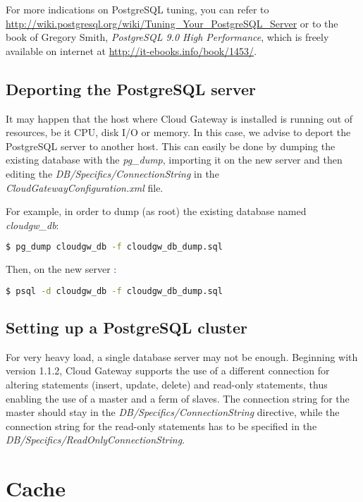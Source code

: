 \documentclass[11pt,fleqn,openany]{book} %
\newcommand{\cgversion}{1.1.2}
\begin{document}
For more indications on PostgreSQL tuning, you can refer to \url{http://wiki.postgresql.org/wiki/Tuning\_Your\_PostgreSQL\_Server} or to the book of Gregory Smith, \textit{PostgreSQL 9.0 High Performance},
 which is freely available on internet at \url{http://it-ebooks.info/book/1453/}.

\subsection{Deporting the PostgreSQL server}

It may happen that the host where Cloud Gateway is installed is running out of resources, be it CPU, disk I/O or memory. In this case, we advise to deport the PostgreSQL server to another host.
This can easily be done by dumping the existing database with the \textit{pg\_dump}, importing it on the new server and then editing the \textit{DB/Specifics/ConnectionString} in the \textit{CloudGatewayConfiguration.xml}
file.

For example, in order to dump (as root) the existing database named \textit{cloudgw\_db}:

\begin{lstlisting}[language=bash]
$ pg_dump cloudgw_db -f cloudgw_db_dump.sql
\end{lstlisting}

Then, on the new server :
\begin{lstlisting}[language=bash]
$ psql -d cloudgw_db -f cloudgw_db_dump.sql
\end{lstlisting}

\subsection{Setting up a PostgreSQL cluster}

For very heavy load, a single database server may not be enough. Beginning with version \cgversion, Cloud Gateway supports the use of a different connection for altering statements (insert, update, delete)
and read-only statements, thus enabling the use of a master and a ferm of slaves.
The connection string for the master should stay in the \textit{DB/Specifics/ConnectionString} directive, while the connection string for the read-only statements has to be specified in the
\textit{DB/Specifics/ReadOnlyConnectionString}.

\section{Cache}
\label{sec:cache}
\end{document}
